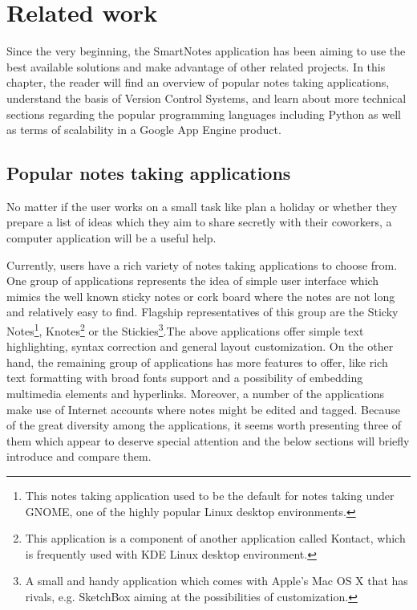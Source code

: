 \chapter{Related work}\label{sec:related_work}
Since the very beginning, the SmartNotes application has been aiming to use the best available solutions and make advantage of other related projects. In this chapter, the reader will find an overview of popular notes taking applications, understand the basis of Version Control Systems, and learn about more technical sections regarding the popular programming languages including Python  as well as terms of scalability in a Google App Engine product.

\section{Popular notes taking applications}\label{sec:popular_apps} 
No matter if the user works on a small task like plan a holiday or whether they prepare a list of ideas which they aim to share secretly with their coworkers, a computer application will be a useful help.     

Currently, users have a rich variety of notes taking applications to choose from. One group of applications represents the idea of simple user interface which mimics the well known sticky notes or cork board where the notes are not long and relatively easy to find. Flagship representatives of this group are the Sticky Notes\footnote{This notes taking application used to be the default for notes taking under GNOME, one of the highly popular Linux desktop environments.}, Knotes\footnote{This application is a component of another application called Kontact, which is frequently used with KDE Linux desktop environment.} or the Stickies\footnote{A small and handy application which comes with Apple's Mac OS X that has rivals, e.g. SketchBox aiming at the possibilities of customization.}.The above applications offer simple text highlighting, syntax correction and general layout customization. On the other hand, the remaining group of applications has more features to offer, like rich text formatting with broad fonts support and a possibility of embedding multimedia elements and hyperlinks. Moreover, a number of the applications make use of Internet accounts where notes might be edited and tagged. Because of the great diversity among the applications, it seems worth presenting three of them which appear to deserve special attention and the below sections will briefly introduce and compare them.


